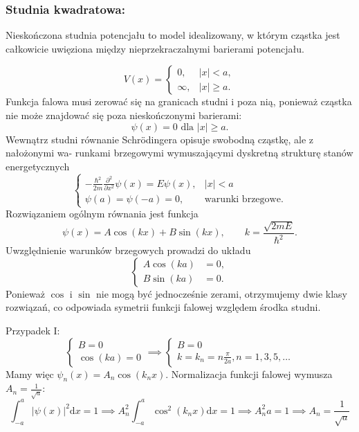 \subsubsection*{Studnia kwadratowa:}
Nieskończona studnia potencjału to model idealizowany, w którym cząstka jest całkowicie
uwięziona między nieprzekraczalnymi barierami potencjału.

\begin{equation*}
	V(x) = \begin{cases}
		0, &|x|<a,\\
		\infty, &|x|\geq a.
	\end{cases}
\end{equation*}
Funkcja falowa musi zerować się na granicach studni i poza nią, ponieważ cząstka nie może znajdować się poza nieskończonymi barierami:
\begin{equation*}
	\psi(x) = 0 \text{ dla } |x| \geq a.
\end{equation*}
Wewnątrz studni równanie Schrödingera opisuje swobodną cząstkę, ale z nałożonymi wa-
runkami brzegowymi wymuszającymi dyskretną strukturę stanów energetycznych
\begin{equation*}
	\begin{cases}
		-\frac{\hbar^2}{2m}\frac{\partial^2}{\partial x^2}\psi(x) = E\psi(x), &|x|<a\\
		\psi(a) = \psi(-a) = 0, & \text{warunki brzegowe.}
	\end{cases}
\end{equation*}
Rozwiązaniem ogólnym równania jest funkcja \begin{equation*}
	\psi(x) = A\cos(kx) + B\sin(kx), \qquad k = \frac{\sqrt{2mE}}{\hbar^2}.
\end{equation*}
Uwzględnienie warunków brzegowych prowadzi do układu
\begin{equation*}
	\begin{cases}
		A\cos(ka) &= 0,\\
		B\sin(ka) &= 0.
	\end{cases}
\end{equation*}
Ponieważ $\cos$ i $\sin$ nie mogą być jednocześnie zerami, otrzymujemy dwie klasy rozwiązań, co odpowiada symetrii funkcji falowej względem środka studni.

Przypadek I:
\begin{equation*}
	\begin{cases}
		B = 0\\
		\cos(ka) = 0
	\end{cases}
	 \implies
	\begin{cases}
		B = 0\\
		k = k_n = n \frac{\pi}{2a}, n = 1, 3, 5, \dots
	\end{cases}
\end{equation*}
Mamy więc $\psi_n(x) = A_n \cos(k_n x)$. Normalizacja funkcji falowej wymusza $A_n = \frac{1}{\sqrt{a}}$:
\begin{equation*}
	\int_{-a}^{a} |\psi(x)|^2 \mathrm{d}x = 1 \implies A_n^2 \int_{-a}^{a} \cos^2(k_nx) \mathrm{d}x = 1 \implies A_n^2 a = 1 \implies A_n = \frac{1}{\sqrt{a}}
\end{equation*}


